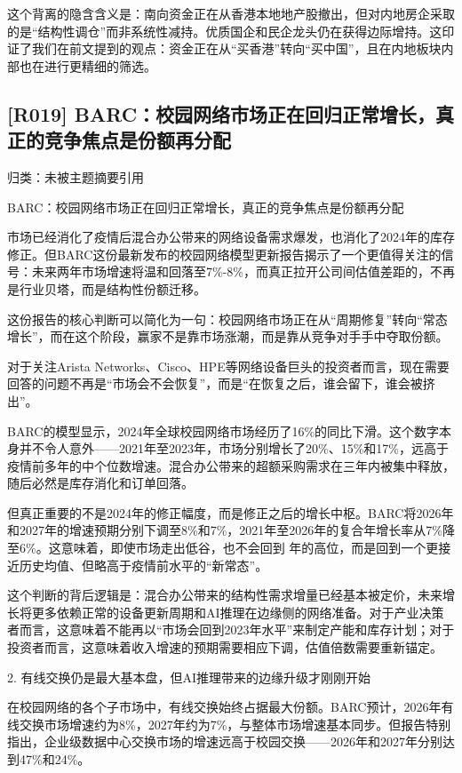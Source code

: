 \documentclass[11pt]{ctexart}
\begin{document}
这个背离的隐含含义是：南向资金正在从香港本地地产股撤出，但对内地房企采取的是“结构性调仓”而非系统性减持。优质国企和民企龙头仍在获得边际增持。这印证了我们在前文提到的观点：资金正在从“买香港”转向“买中国”，且在内地板块内部也在进行更精细的筛选。

\subsection{[R019] BARC：校园网络市场正在回归正常增长，真正的竞争焦点是份额再分配}
{\small\color{refgray}归类：未被主题摘要引用}

BARC：校园网络市场正在回归正常增长，真正的竞争焦点是份额再分配

市场已经消化了疫情后混合办公带来的网络设备需求爆发，也消化了2024年的库存修正。但BARC这份最新发布的校园网络模型更新报告揭示了一个更值得关注的信号：未来两年市场增速将温和回落至7\%-8\%，而真正拉开公司间估值差距的，不再是行业贝塔，而是结构性份额迁移。

这份报告的核心判断可以简化为一句：校园网络市场正在从“周期修复”转向“常态增长”，而在这个阶段，赢家不是靠市场涨潮，而是靠从竞争对手手中夺取份额。

对于关注Arista Networks、Cisco、HPE等网络设备巨头的投资者而言，现在需要回答的问题不再是“市场会不会恢复”，而是“在恢复之后，谁会留下，谁会被挤出”。

BARC的模型显示，2024年全球校园网络市场经历了16\%的同比下滑。这个数字本身并不令人意外——2021年至2023年，市场分别增长了20\%、15\%和17\%，远高于疫情前多年的中个位数增速。混合办公带来的超额采购需求在三年内被集中释放，随后必然是库存消化和订单回落。

但真正重要的不是2024年的修正幅度，而是修正之后的增长中枢。BARC将2026年和2027年的增速预期分别下调至8\%和7\%，2021年至2026年的复合年增长率从7\%降至6\%。这意味着，即使市场走出低谷，也不会回到 年的高位，而是回到一个更接近历史均值、但略高于疫情前水平的“新常态”。

这个判断的背后逻辑是：混合办公带来的结构性需求增量已经基本被定价，未来增长将更多依赖正常的设备更新周期和AI推理在边缘侧的网络准备。对于产业决策者而言，这意味着不能再以“市场会回到2023年水平”来制定产能和库存计划；对于投资者而言，这意味着收入增速的预期需要相应下调，估值倍数需要重新锚定。

2. 有线交换仍是最大基本盘，但AI推理带来的边缘升级才刚刚开始

在校园网络的各个子市场中，有线交换始终占据最大份额。BARC预计，2026年有线交换市场增速约为8\%，2027年约为7\%，与整体市场增速基本同步。但报告特别指出，企业级数据中心交换市场的增速远高于校园交换——2026年和2027年分别达到47\%和24\%。
\end{document}
